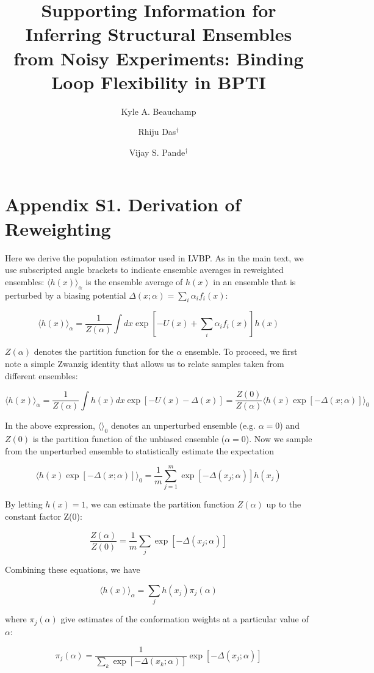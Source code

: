\documentclass[journal=jacsat,manuscript=article]{achemso}
\author{Kyle A. Beauchamp}
\affiliation[Biophysics Program]{Biophysics Program}
\author{Rhiju Das$^\dagger$}
\affiliation[Biochemistry Department]{Biochemistry Department, Stanford University, Stanford, CA}
\author{Vijay S. Pande$^\dagger$}
\affiliation[Chemistry Department]{Chemistry Department, Stanford University, Stanford, CA}
\title{Supporting Information for Inferring Structural Ensembles from Noisy Experiments: Binding Loop Flexibility in BPTI}
\begin{document}
\maketitle

\newpage

\section{Appendix S1.  Derivation of Reweighting}

Here we derive the population estimator used in LVBP.  As in the main text, we use subscripted angle brackets to indicate ensemble averages in reweighted ensembles: $\langle h(x)\rangle _\alpha$ is the ensemble average of $h(x)$ in an ensemble that is perturbed by a biasing potential $\Delta (x;\alpha) = \sum_i \alpha_i f_i(x)$:

$$\langle h(x)\rangle _\alpha = \frac{1}{Z(\alpha)} \int dx \exp[-U(x) + \sum_i \alpha_i f_i(x)] h(x)$$

$Z(\alpha)$ denotes the partition function for the $\alpha$ ensemble.  To proceed, we first note a simple Zwanzig identity that allows us to relate samples taken from different ensembles:

$$\langle h(x)\rangle _\alpha = \frac{1}{Z(\alpha)} \int h(x) dx \exp[ -U(x) - \Delta(x)] = \frac{Z(0)}{Z(\alpha)} \langle h(x) \exp[-\Delta(x;\alpha)]\rangle _0 $$

In the above expression, $\langle \rangle_0$ denotes an unperturbed ensemble (e.g. $\alpha = 0$) and $Z(0)$ is the partition function of the unbiased ensemble ($\alpha = 0$).  Now we sample from the unperturbed ensemble to statistically estimate the expectation

$$\langle h(x) \exp[-\Delta(x;\alpha)]\rangle _0 = \frac{1}{m} \sum_{j = 1}^{m} \exp [ - \Delta(x_j;\alpha)] h(x_j)$$

By letting $h(x) = 1$, we can estimate the partition function $Z(\alpha)$ up to the constant factor Z(0):

$$ \frac{Z(\alpha)}{Z(0)} = \frac{1}{m} \sum_j \exp[-\Delta(x_j;\alpha)]$$

Combining these equations, we have

$$\langle h(x)\rangle _\alpha = \sum_j h(x_j) \pi_j(\alpha)$$

where $\pi_j(\alpha)$ give estimates of the conformation weights at a particular value of $\alpha$:

$$\pi_j(\alpha) = \frac{1}{\sum_k \exp[-\Delta(x_k;\alpha)]} \exp[-\Delta(x_j;\alpha)]$$
\end{document}
